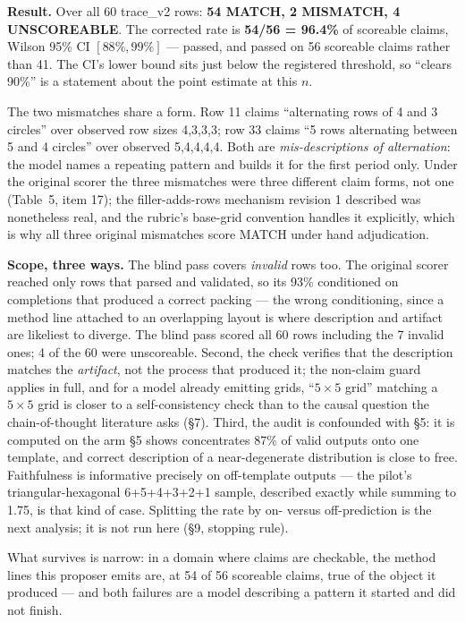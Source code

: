 \documentclass[11pt]{article}
\begin{document}
\textbf{Result.} Over all 60 trace\_v2 rows: \textbf{54 MATCH, 2 MISMATCH, 4 UNSCOREABLE}. The corrected
rate is \textbf{54/56 = 96.4\%} of scoreable claims, Wilson 95\% CI $[88\%, 99\%]$ --- passed, and passed on
56 scoreable claims rather than 41. The CI's lower bound sits just below the registered
threshold, so ``clears 90\%'' is a statement about the point estimate at this $n$.

The two mismatches share a form. Row 11 claims ``alternating rows of 4 and 3 circles'' over
observed row sizes 4,3,3,3; row 33 claims ``5 rows alternating between 5 and 4 circles'' over
observed 5,4,4,4,4. Both are \textit{mis-descriptions of alternation}: the model names a repeating
pattern and builds it for the first period only. Under the original scorer the three mismatches
were three different claim forms, not one (Table~5, item 17); the filler-adds-rows mechanism
revision 1 described was nonetheless real, and the rubric's base-grid convention handles it
explicitly, which is why all three original mismatches score MATCH under hand adjudication.

\textbf{Scope, three ways.} The blind pass covers \textit{invalid} rows too. The original scorer reached
only rows that parsed and validated, so its 93\% conditioned on completions that produced a
correct packing --- the wrong conditioning, since a method line attached to an overlapping layout
is where description and artifact are likeliest to diverge. The blind pass scored all 60 rows
including the 7 invalid ones; 4 of the 60 were unscoreable. Second, the check verifies that the
description matches the \textit{artifact}, not the process that produced it; the non-claim guard
applies in full, and for a model already emitting grids, ``$5\times5$ grid'' matching a $5\times5$ grid is
closer to a self-consistency check than to the causal question the chain-of-thought literature
asks (\S7). Third, the audit is confounded with \S5: it is computed on the arm \S5 shows
concentrates 87\% of valid outputs onto one template, and correct description of a
near-degenerate distribution is close to free. Faithfulness is informative precisely on
off-template outputs --- the pilot's triangular-hexagonal 6+5+4+3+2+1 sample, described exactly
while summing to 1.75, is that kind of case. Splitting the rate by on- versus off-prediction
is the next analysis; it is not run here (\S9, stopping rule).

What survives is narrow: in a domain where claims are checkable, the method lines this proposer
emits are, at 54 of 56 scoreable claims, true of the object it produced --- and both failures are
a model describing a pattern it started and did not finish.
\end{document}
